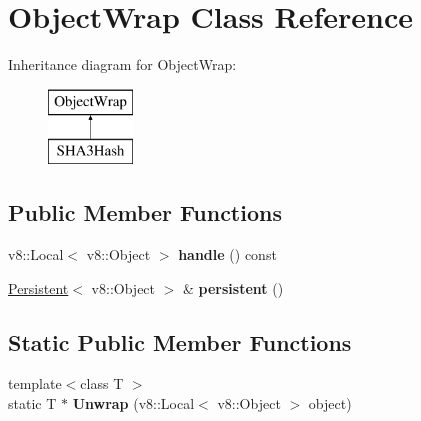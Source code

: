\hypertarget{class_object_wrap}{}\section{Object\+Wrap Class Reference}
\label{class_object_wrap}
Inheritance diagram for Object\+Wrap\+:\begin{figure}[H]
\begin{center}
\leavevmode
\includegraphics[height=2.000000cm]{class_object_wrap}
\end{center}
\end{figure}
\subsection*{Public Member Functions}
\begin{DoxyCompactItemize}
\item 
\mbox{\label{class_object_wrap_adac43bd875eba2330b9d15910827292f}} 
v8\+::\+Local$<$ v8\+::\+Object $>$ {\bfseries handle} () const
\item 
\mbox{\label{class_object_wrap_afe0c5fff63d1868ec182d9ac71f4e597}} 
\hyperlink{class_persistent}{Persistent}$<$ v8\+::\+Object $>$ \& {\bfseries persistent} ()
\end{DoxyCompactItemize}
\subsection*{Static Public Member Functions}
\begin{DoxyCompactItemize}
\item 
\mbox{\label{class_object_wrap_ac6fafb8f10ee55097e3b808d02c1d3bf}} 
{\footnotesize template$<$class T $>$ }\\static T $\ast$ {\bfseries Unwrap} (v8\+::\+Local$<$ v8\+::\+Object $>$ object)
\end{DoxyCompactItemize}
